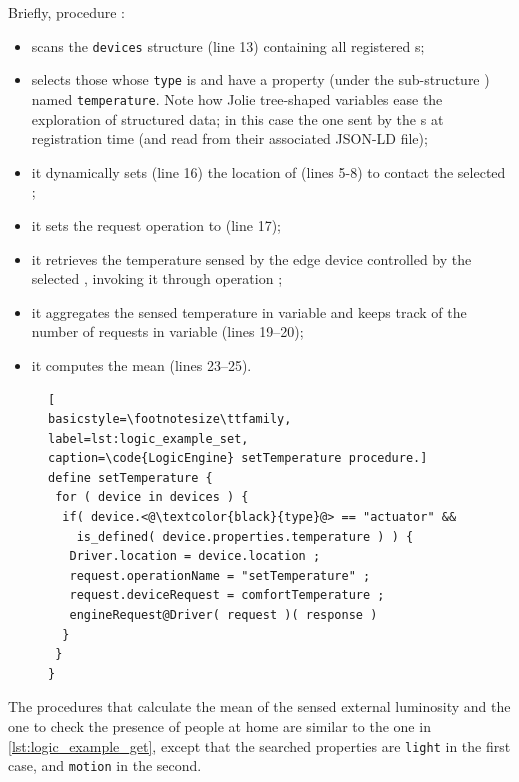 \newpage

Briefly, procedure :

\begin{itemize}
  \item scans the \lstinline{devices} structure (line 13) containing all
  registered s;
  \item selects those whose {\small\texttt{type}} is  and have
  a property (under the sub-structure ) named
  \lstinline{temperature}. Note how Jolie tree-shaped variables ease the
  exploration of structured data; in this case the one sent by the
  s at registration time (and read from their associated JSON-LD
  file);
  \item it dynamically sets (line 16) the location of 
  (lines 5-8) to contact the selected ;
  \item it sets the request operation to  (line 17);
  \item it retrieves the temperature sensed by the edge device controlled by
  the selected , invoking it through operation
  ;
  \item it aggregates the sensed temperature in variable  and keeps
  track of the number of requests in variable  (lines 19--20);
  \item it computes the mean  (lines 23--25).
\end{itemize}
%

\begin{figure}[b]
\begin{lstlisting}[
basicstyle=\footnotesize\ttfamily,
label=lst:logic_example_set,
caption=\code{LogicEngine} setTemperature procedure.]
define setTemperature {
 for ( device in devices ) {
  if( device.<@\textcolor{black}{type}@> == "actuator" &&
    is_defined( device.properties.temperature ) ) {
   Driver.location = device.location ;
   request.operationName = "setTemperature" ;
   request.deviceRequest = comfortTemperature ;
   engineRequest@Driver( request )( response )
  }
 }
}
\end{lstlisting}
\end{figure}

The procedures that calculate the mean of the sensed external luminosity and
the one to check the presence of people at home are similar to the one in
\cref{lst:logic_example_get}, except that the searched properties are
\lstinline{light} in the first case, and \lstinline{motion} in the second.

